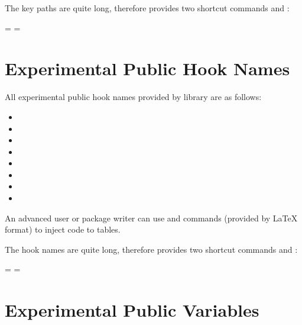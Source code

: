 \documentclass[oneside]{book}
\begin{document}
{The key paths are quite long, therefore  provides two shortcut commands
\CC{\DeclareTblrKeys} and \CC{\SetTblrKeys}:

\begin{codehigh}
 = 
 = 
\end{codehigh}

\section{Experimental Public Hook Names}

All experimental public  hook names provided by  library are as follows:
\begin{itemize}[nosep]
  \item {}
  \item {}
  \item {}
  \item {}
  \item {}
  \item {}
  \item {}
  \item {}
\end{itemize}
An advanced user or package writer can use \CC{\AddToHook} and \CC{\AddToHookNext} commands
(provided by LaTeX format) to inject code to  tables.

The hook names are quite long, therefore  provides two shortcut commands
\CC{\AddToTblrHook} and \CC{\AddToTblrHookNext}:

\begin{codehigh}
 = 
 = 
\end{codehigh}

\section{Experimental Public Variables}

}
\end{document}
